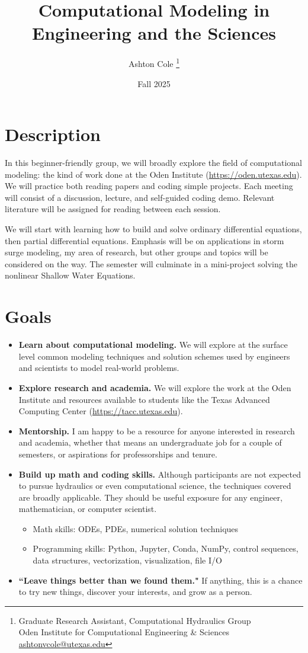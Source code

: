 \documentclass{article}
\title{Computational Modeling in Engineering and the Sciences}
\author{Ashton Cole \thanks{Graduate Research Assistant, Computational Hydraulics Group \\ Oden Institute for Computational Engineering \& Sciences \\ \href{mailto:ashtonvcole@utexas.edu}{ashtonvcole@utexas.edu}}}
\date{Fall 2025}
\begin{document}
	\maketitle
	
	\section*{Description}
	In this beginner-friendly group, we will broadly explore the field of computational modeling: the kind of work done at the Oden Institute (\href{https://oden.utexas.edu}{https://oden.utexas.edu}). We will practice both reading papers and coding simple projects. Each meeting will consist of a discussion, lecture, and self-guided coding demo. Relevant literature will be assigned for reading between each session.
	
	We will start with learning how to build and solve ordinary differential equations, then partial differential equations. Emphasis will be on applications in storm surge modeling, my area of research, but other groups and topics will be considered on the way. The semester will culminate in a mini-project solving the nonlinear Shallow Water Equations.
	
	\section*{Goals}
	\begin{itemize}
		\item \textbf{Learn about computational modeling.} We will explore at the surface level common modeling techniques and solution schemes used by engineers and scientists to model real-world problems.
		\item \textbf{Explore research and academia.} We will explore the work at the Oden Institute and resources available to students like the Texas Advanced Computing Center (\href{https://tacc.utexas.edu}{https://tacc.utexas.edu}).
		\item \textbf{Mentorship.} I am happy to be a resource for anyone interested in research and academia, whether that means an undergraduate job for a couple of semesters, or aspirations for professorships and tenure.
		\item \textbf{Build up math and coding skills.} Although participants are not expected to pursue hydraulics or even computational science, the techniques covered are broadly applicable. They should be useful exposure for any engineer, mathematician, or computer scientist.
		\begin{itemize}
			\item Math skills: ODEs, PDEs, numerical solution techniques
			\item Programming skills: Python, Jupyter, Conda, NumPy, control sequences, data structures, vectorization, visualization, file I/O
		\end{itemize}
		\item \textbf{``Leave things better than we found them."} If anything, this is a chance to try new things, discover your interests, and grow as a person.
	\end{itemize}
	
\end{document}
